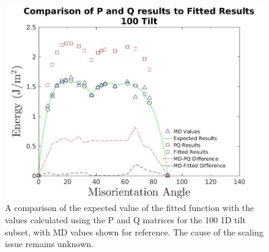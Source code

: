 \documentclass[twoside,senior]{BYUPhys}
\begin{document}
\begin{figure}[ht!]
 \centering
 \includegraphics[scale=0.26]{Images/100TiltPQvsMD}
 \caption[Comparison of the PQ matrices with the expected result for \textlangle{}100\textrangle{} tilt.]{\label{fig:100PQ} A comparison of the expected value of the fitted function with the values calculated using the P and Q matrices for the \textlangle{}100\textrangle{} 1D tilt subset, with MD values shown for reference.  The cause of the scaling issue remains unknown.}
\end{figure}
\end{document}
